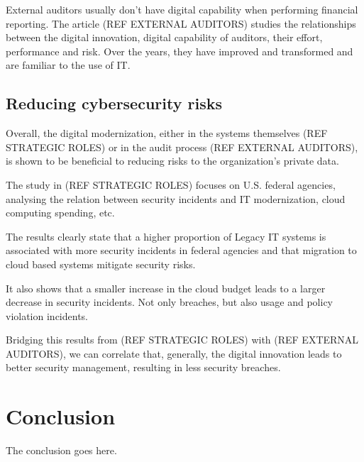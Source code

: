 \documentclass[journal]{IEEEtran}
\begin{document}
External auditors usually don't have digital capability when performing financial reporting. The article (REF EXTERNAL AUDITORS) studies the relationships between the digital innovation, digital capability of auditors, their effort, performance and risk. 
Over the years, they have improved and transformed and are familiar to the use of IT. 


\subsection{Reducing cybersecurity risks}

Overall, the digital modernization, either in the systems themselves (REF STRATEGIC ROLES) or in the audit process (REF EXTERNAL AUDITORS), is shown to be beneficial to reducing risks to the organization's private data. 

The study in (REF STRATEGIC ROLES) focuses on U.S. federal agencies, analysing the relation between security incidents and IT modernization, cloud computing spending, etc. 

The results clearly state that a higher proportion of Legacy IT systems is associated with more security incidents in federal agencies and that migration to cloud based systems mitigate security risks. 

It also shows that a smaller increase in the cloud budget leads to a larger decrease in security incidents. Not only breaches, but also usage and policy violation incidents.

Bridging this results from (REF STRATEGIC ROLES) with (REF EXTERNAL AUDITORS), we can correlate that, generally, the digital innovation leads to better security management, resulting in less security breaches.

\section{Conclusion}
The conclusion goes here.





\end{document}
